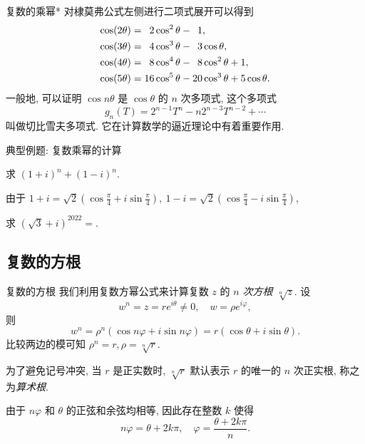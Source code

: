 \begin{frame}{复数的乘幂*}
	\onslide<+->
	对棣莫弗公式左侧进行二项式展开可以得到
	\onslide<+->
	\begin{align*}
		\cos(2\theta)&=\hphantom{1}2\cos^2\theta-\hphantom{1}1,\\
		\cos(3\theta)&=\hphantom{1}4\cos^3\theta-\hphantom{1}3\cos\theta,\\
		\cos(4\theta)&=\hphantom{1}8\cos^4\theta-\hphantom{1}8\cos^2\theta+1,\\
		\cos(5\theta)&=16\cos^5\theta-20\cos^3\theta+5\cos\theta.
	\end{align*}
	\onslide<+->
	一般地, 可以证明 $\cos{n\theta}$ 是 $\cos\theta$ 的 $n$ 次多项式,
	\onslide<+->
	这个多项式
	\[g_n(T)=2^{n-1}T^n-n2^{n-3}T^{n-2}+\cdots\]
	叫做切比雪夫多项式.
	\onslide<+->
	它在计算数学的逼近理论中有着重要作用.
\end{frame}


\begin{frame}{典型例题: 复数乘幂的计算}
	\onslide<+->
	\begin{example}
		求 $(1+i)^n+(1-i)^n$.
	\end{example}

	\onslide<+->
	\begin{solution}
		由于 $1+i=\sqrt2\left(\cos\frac\pi4+i\sin\frac\pi4\right),\ 
		1-i=\sqrt2\left(\cos\frac\pi4-i\sin\frac\pi4\right)$,
		\vspace{-\baselineskip}
	\end{solution}

	\onslide<+->
	\begin{exercise}
		求 $(\sqrt3+i)^{2022}=$.
	\end{exercise}
\end{frame}


\subsection{复数的方根}
\begin{frame}{复数的方根}
	\onslide<+->
	我们利用复数方幂公式来计算复数 $z$ 的 \emph{$n$ 次方根 $\sqrt[n]z$}.
	\onslide<+->
	设
	\[w^n=z=re^{i\theta}\neq0,\quad w=\rho e^{i\varphi},\]
	\onslide<+->
	则
	\[w^n=\rho^n(\cos{n\varphi}+i\sin{n\varphi})=r(\cos\theta+i\sin\theta).\]
	\onslide<+->
	比较两边的模可知 $\rho^n=r,\rho=\sqrt[n]r$.

	\onslide<+->
	为了避免记号冲突, 当 $r$ 是正实数时, $\sqrt[n]r$ 默认表示 $r$ 的唯一的 $n$ 次正实根, 称之为\emph{算术根}.

	\onslide<+->
	由于 $n\varphi$ 和 $\theta$ 的正弦和余弦均相等, 因此存在整数 $k$ 使得
	\[n\varphi=\theta+2k\pi,\quad \varphi=\frac{\theta+2k\pi}n.\]
\end{frame}


